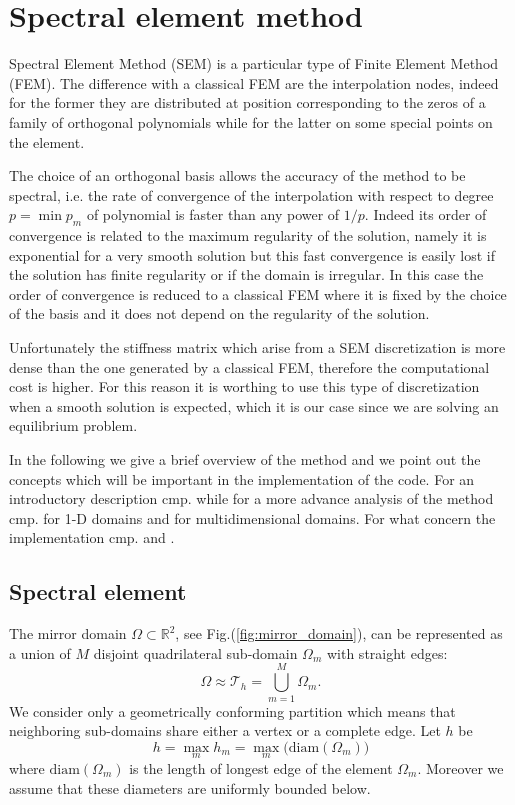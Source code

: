 \section{Spectral element method}\label{sec:spectral_aproximation}
Spectral Element Method (SEM) is a particular type of Finite Element Method (FEM). The difference with a classical FEM are the interpolation nodes, indeed for the former they are distributed at position corresponding to the zeros of a family of orthogonal polynomials while for the latter on some special points on the element.

The choice of an orthogonal basis allows the accuracy of the method to be spectral, i.e. the rate of convergence of the interpolation with respect to degree $p=\min p_m$ of polynomial is faster than any power of $1/p$. Indeed its order of convergence is related to the maximum regularity of the solution, namely it is exponential for a very smooth solution but this fast convergence is easily lost if the solution has finite regularity or if the domain is irregular. In this case the order of convergence is reduced to a classical FEM where it is fixed by the choice of the basis and it does not depend on the regularity of the solution.

Unfortunately the stiffness matrix which arise from a SEM discretization is more dense than the one generated by a classical FEM, therefore the computational cost is higher. For this reason it is worthing to use this type of discretization when a smooth solution is expected, which it is our case since we are solving an equilibrium problem.

In the following we give a brief overview of the method and we point out the concepts which will be important in the implementation of the code. For an introductory description cmp. \cite{QUARTERONI} while for a more advance analysis  of the method cmp. \cite{CHQZ06} for 1-D domains and \cite{CHQZ07} for multidimensional domains. For what concern the implementation cmp. \cite{KARNIADAKIS} and \cite{HENDERSON}.

\subsection{Spectral element}\label{subsec:sem_element}
The mirror domain $\Omega\subset\mathbb{R}^2$, see Fig.(\ref{fig:mirror_domain}), can be represented as a union of $M$ disjoint quadrilateral sub-domain $\Omega_m$ with straight edges:
\begin{equation}
  \Omega\approx\mathcal{T}_h=\bigcup_{m=1}^M\Omega_m.
\end{equation}
We consider only a geometrically conforming partition which means that neighboring sub-domains share either a vertex or a complete edge. Let $h$ be
\begin{equation}
  h=\max_m h_m=\max_m\big(\mathrm{diam}(\Omega_m)\big)
\end{equation}
where $\mathrm{diam}(\Omega_m)$ is the length of longest edge of the element $\Omega_m$. Moreover we assume that these diameters are uniformly bounded below.

